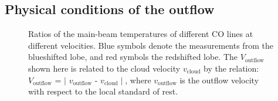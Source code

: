 \subsection{Physical conditions of the outflow}

\begin{figure}[tbp]
\caption{Ratios of the main-beam temperatures of different CO lines at different velocities. Blue symbols denote the measurements from the blueshifted lobe, and red symbols the redshifted lobe. The $V_{\mathrm{outflow}}$ shown here is related to the cloud velocity $v_{\mathrm{cloud}}$ by the relation: $V_{\mathrm{outflow}}$ = $\mid$ $v_{\mathrm{outflow}}$ - $v_{\mathrm{cloud}}\mid$, where $v_{\mathrm{outflow}}$ is the outflow velocity with respect to the local standard of rest. \label{fig:figratio}}
\end{figure}

